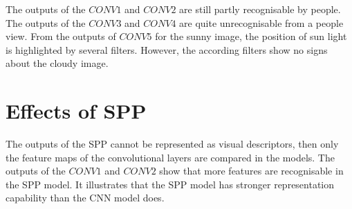 The outputs of the $CONV1$ and $CONV2$ are still partly recognisable by people. The outputs of the $CONV3$ and $CONV4$ are quite unrecognisable from a people view. From the outputs of $CONV5$ for the sunny image, the position of sun light is highlighted by several filters. However, the according filters show no signs about the cloudy image.

\section{Effects of SPP}

The outputs of the SPP cannot be represented as visual descriptors, then only the feature maps of the convolutional layers are compared in the models. The outputs of the $CONV1$ and $CONV2$ show that more features are recognisable in the SPP model. It illustrates that the SPP model has stronger representation capability than the CNN model does.
 
